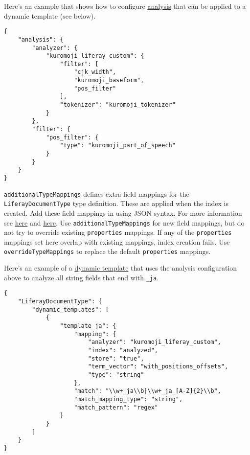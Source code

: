 Here's an example that shows how to configure
\href{https://www.elastic.co/guide/en/elasticsearch/guide/current/analysis-intro.html\#analysis-intro}{analysis}
that can be applied to a dynamic template (see below).

\begin{verbatim}
{  
    "analysis": {
        "analyzer": {
            "kuromoji_liferay_custom": {
                "filter": [
                    "cjk_width",
                    "kuromoji_baseform",
                    "pos_filter"
                ],
                "tokenizer": "kuromoji_tokenizer"
            }
        },
        "filter": {
            "pos_filter": {
                "type": "kuromoji_part_of_speech"
            }
        }
    }
}
\end{verbatim}

\texttt{additionalTypeMappings} defines extra field mappings for the
\texttt{LiferayDocumentType} type definition. These are applied when the
index is created. Add these field mappings in using JSON syntax. For
more information see
\href{https://www.elastic.co/guide/en/elasticsearch/reference/6.1/mapping.html}{here}
and
\href{https://www.elastic.co/guide/en/elasticsearch/reference/6.1/indices-put-mapping.html}{here}.
Use \texttt{additionalTypeMappings} for new field mappings, but do not
try to override existing \texttt{properties} mappings. If any of the
\texttt{properties} mappings set here overlap with existing mappings,
index creation fails. Use \texttt{overrideTypeMappings} to replace the
default \texttt{properties} mappings.

Here's an example of a
\href{https://www.elastic.co/guide/en/elasticsearch/reference/6.1/dynamic-templates.html}{dynamic
template} that uses the analysis configuration above to analyze all
string fields that end with \texttt{\_ja}.

\begin{verbatim}
{
    "LiferayDocumentType": {
        "dynamic_templates": [
            {
                "template_ja": {
                    "mapping": {
                        "analyzer": "kuromoji_liferay_custom",
                        "index": "analyzed",
                        "store": "true",
                        "term_vector": "with_positions_offsets",
                        "type": "string"
                    },
                    "match": "\\w+_ja\\b|\\w+_ja_[A-Z]{2}\\b",
                    "match_mapping_type": "string",
                    "match_pattern": "regex"
                }
            }
        ]
    }
}
\end{verbatim}


